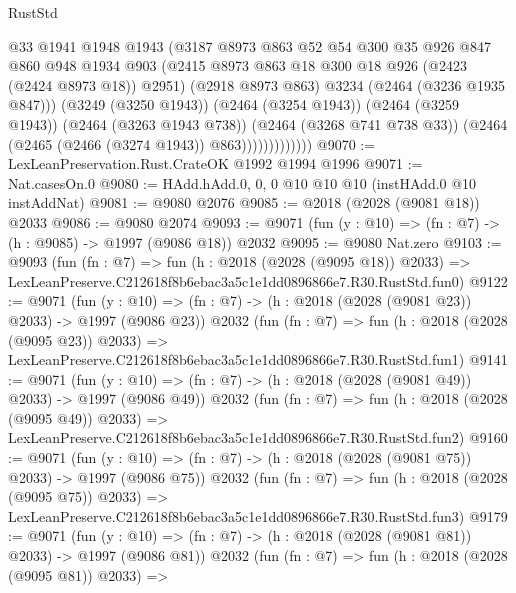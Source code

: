 \begin{lexlean}{RustStd}
\begin{coremodule}
                          @33
                          @1941
                          @1948
                          @1943
                          (@3187
                            @8973
                            @863
                            @52
                            @54
                            @300
                            @35
                            @926
                            @847
                            @860
                            @948
                            @1934
                            @903
                            (@2415 @8973 @863 @18 @300 @18 @926 (@2423 (@2424 @8973 @18)) @2951)
                            (@2918 @8973 @863)
                            @3234
                            (@2464 (@3236 @1935 @847)))
                          (@3249 (@3250 @1943))
                          (@2464 (@3254 @1943))
                          (@2464 (@3259 @1943))
                          (@2464 (@3263 @1943 @738))
                          (@2464 (@3268 @741 @738 @33))
                          (@2464 (@2465 (@2466 (@3274 @1943)) @863)))))))))))))
@9070 := LexLeanPreservation.Rust.CrateOK @1992 @1994 @1996
@9071 := Nat.casesOn.{0}
@9080 := HAdd.hAdd.{0, 0, 0} @10 @10 @10 (instHAdd.{0} @10 instAddNat)
@9081 := @9080 @2076
@9085 := @2018 (@2028 (@9081 @18)) @2033
@9086 := @9080 @2074
@9093 := @9071 (fun (y : @10) => (fn : @7) -> (h : @9085) -> @1997 (@9086 @18)) @2032
@9095 := @9080 Nat.zero
@9103 := @9093
    (fun (fn : @7) =>
    fun (h : @2018 (@2028 (@9095 @18)) @2033) =>
    LexLeanPreserve.C212618f8b6ebac3a5c1e1dd0896866e7.R30.RustStd.fun0)
@9122 := @9071
    (fun (y : @10) => (fn : @7) -> (h : @2018 (@2028 (@9081 @23)) @2033) -> @1997 (@9086 @23))
    @2032
    (fun (fn : @7) =>
    fun (h : @2018 (@2028 (@9095 @23)) @2033) =>
    LexLeanPreserve.C212618f8b6ebac3a5c1e1dd0896866e7.R30.RustStd.fun1)
@9141 := @9071
    (fun (y : @10) => (fn : @7) -> (h : @2018 (@2028 (@9081 @49)) @2033) -> @1997 (@9086 @49))
    @2032
    (fun (fn : @7) =>
    fun (h : @2018 (@2028 (@9095 @49)) @2033) =>
    LexLeanPreserve.C212618f8b6ebac3a5c1e1dd0896866e7.R30.RustStd.fun2)
@9160 := @9071
    (fun (y : @10) => (fn : @7) -> (h : @2018 (@2028 (@9081 @75)) @2033) -> @1997 (@9086 @75))
    @2032
    (fun (fn : @7) =>
    fun (h : @2018 (@2028 (@9095 @75)) @2033) =>
    LexLeanPreserve.C212618f8b6ebac3a5c1e1dd0896866e7.R30.RustStd.fun3)
@9179 := @9071
    (fun (y : @10) => (fn : @7) -> (h : @2018 (@2028 (@9081 @81)) @2033) -> @1997 (@9086 @81))
    @2032
    (fun (fn : @7) =>
    fun (h : @2018 (@2028 (@9095 @81)) @2033) =>

\end{coremodule}
\end{lexlean}
